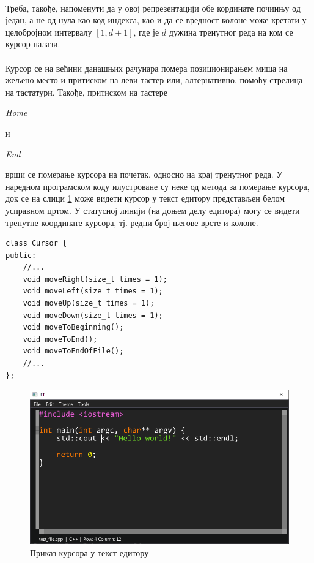 \documentclass[12pt,oneside]{memoir}
\begin{document}
\paragraph{}
Треба, такође, напоменути да у овој репрезентацији обе кординате починњу од
један, а не од нула као код индекса, као и да се вредност колоне може кретати
у целобројном интервалу \([1, d+1]\), где је \(d\) дужина тренутног реда на ком се
курсор налази.

\paragraph{}
Курсор се на већини данашњих рачунара помера позиционирањем миша на жељено место
и притиском на леви тастер или, алтернативно, помоћу стрелица на тастатури. Такође, 
притиском на тастере \begin{latinica}\textit{Home}\end{latinica} и
\begin{latinica}\textit{End}\end{latinica} врши се померање курсора на почетак, односно на крај тренутног реда. У наредном програмском коду илустроване су неке од метода за померање
курсора, док се на слици \ref{fig:cursor} може видети курсор у текст едитору представљен
белом усправном цртом. У статусној линији (на доњем делу едитора) могу се видети тренутне координате курсора, тј. редни број његове врсте и колоне.

\begin{verbatim}
class Cursor {
public:
	//...
	void moveRight(size_t times = 1);
	void moveLeft(size_t times = 1);
	void moveUp(size_t times = 1);
	void moveDown(size_t times = 1);
	void moveToBeginning();
	void moveToEnd();
	void moveToEndOfFile();
	//...
};
\end{verbatim}

\begin{figure}[!ht]
	\centering
	\includegraphics[width=1.0\textwidth]{images/cursor.png}
	\caption{Приказ курсора у текст едитору}
	\label{fig:cursor}
\end{figure}
\end{document}

